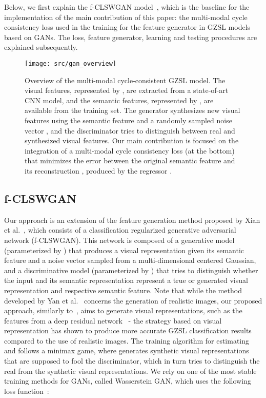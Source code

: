 \documentclass[runningheads]{llncs}
\begin{document}
Below, we first explain the f-CLSWGAN model~\cite{XianCVPR2018}, which is the baseline for the implementation of the main contribution of this paper: the multi-modal cycle consistency loss used in the training for the feature generator in GZSL models based on GANs.  The loss, feature generator, learning and testing procedures are explained subsequently.  


\begin{figure}[h]
\centering
\texttt{[image: src/gan\_overview]}
\caption{Overview of the multi-modal cycle-consistent GZSL model. 
The visual features, represented by , are extracted from a state-of-art CNN model, and the semantic features, represented by , are available from the training set.  The generator  synthesizes new visual features  using the semantic feature and a randomly sampled noise vector , and the discriminator  tries to distinguish between real and synthesized visual features.  Our main contribution is focused on the integration of a multi-modal cycle consistency loss (at the bottom) that minimizes the error between the original semantic feature  and its reconstruction , produced by the regressor .}
\label{fig:overview}

\end{figure}

\subsection{f-CLSWGAN}
\label{sec:CLSWGAN}

Our approach is an extension of the feature generation method proposed by Xian et al.~\cite{XianCVPR2018}, which consists of a classification regularized generative adversarial network (f-CLSWGAN). This network is composed of a generative model  (parameterized by ) that produces a visual representation  given its semantic feature  and a noise vector  sampled from a multi-dimensional centered Gaussian, and a discriminative model  (parameterized by ) that tries to distinguish whether the input  and its semantic representation  represent a true or generated visual representation and respective semantic feature.  
Note that while the method developed by Yan et al.~\cite{yan2016attribute2image} concerns the generation of realistic images, our proposed approach, similarly to~\cite{XianCVPR2018,long2017zero,bucher2017generating}, aims to generate visual representations, such as the features from a deep residual network~\cite{he2016resnet} - the strategy based on visual representation has shown to produce more accurate GZSL classification results compared to the use of realistic images.  
The training algorithm for estimating  and  follows a minimax game, where  generates synthetic visual representations that are supposed to fool the discriminator, which in turn tries to distinguish the real from the synthetic visual representations.  We rely on one of the most stable training methods for GANs, called Wasserstein GAN, which uses the following loss function~\cite{arjovsky2017wasserstein}:
\end{document}
